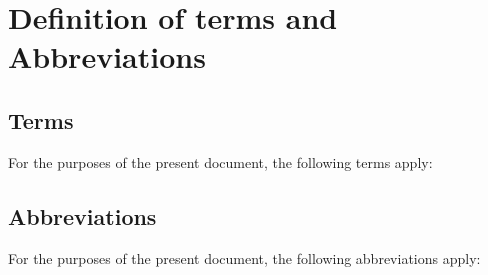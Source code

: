 \glsaddall

\section{Definition of terms and Abbreviations}

\subsection{Terms}

For the purposes of the present document, the following terms apply:

\printglossary[title={}]


\subsection{Abbreviations}

For the purposes of the present document, the following abbreviations apply:

\printglossary[type=\acronymtype,title={}]





